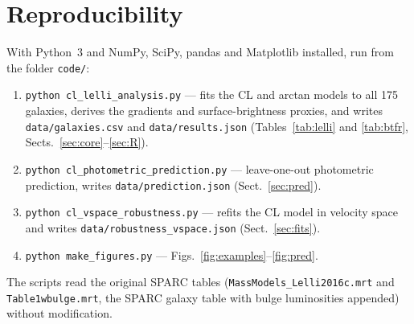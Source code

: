 \documentclass[11pt,a4paper]{article}
\begin{document}
\section{Reproducibility}
\label{app:repro}
With Python~3 and NumPy, SciPy, pandas and Matplotlib installed, run from the folder \texttt{code/}:
\begin{enumerate}
\item \texttt{python cl\_lelli\_analysis.py} --- fits the CL and arctan models to all 175 galaxies, derives the gradients and surface-brightness proxies, and writes \texttt{data/galaxies.csv} and \texttt{data/results.json} (Tables~\ref{tab:lelli} and \ref{tab:btfr}, Sects.~\ref{sec:core}--\ref{sec:R}).
\item \texttt{python cl\_photometric\_prediction.py} --- leave-one-out photometric prediction, writes \texttt{data/prediction.json} (Sect.~\ref{sec:pred}).
\item \texttt{python cl\_vspace\_robustness.py} --- refits the CL model in velocity space and writes \texttt{data/robustness\_vspace.json} (Sect.~\ref{sec:fits}).
\item \texttt{python make\_figures.py} --- Figs.~\ref{fig:examples}--\ref{fig:pred}.
\end{enumerate}
The scripts read the original SPARC tables (\texttt{MassModels\_Lelli2016c.mrt} and \texttt{Table1wbulge.mrt}, the SPARC galaxy table with bulge luminosities appended) without modification.
\end{document}
